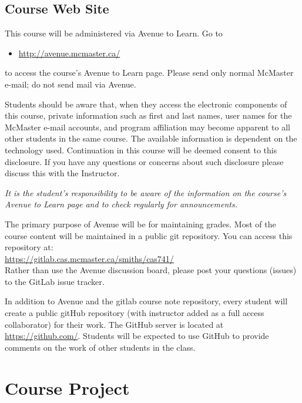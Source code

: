 \documentclass[12pt]{article}
\newcommand{\bi}{\begin{itemize}}
\newcommand{\ei}{\end{itemize}}
\begin{document}
\subsection*{Course Web Site}

This course will be administered via Avenue to Learn.  Go to

\bi

  \item[] \url{http://avenue.mcmaster.ca/} 

\ei

\noindent to access the course's Avenue to Learn page.  Please send only normal 
McMaster e-mail; do not send mail via Avenue.

Students should be aware that, when they access the electronic
components of this course, private information such as first and last
names, user names for the McMaster e-mail accounts, and program
affiliation may become apparent to all other students in the same
course.  The available information is dependent on the technology
used.  Continuation in this course will be deemed consent to this
disclosure.  If you have any questions or concerns about such
disclosure please discuss this with the Instructor.

\emph{It is the student's responsibility to be aware of the
  information on the course's Avenue to Learn page and to check
  regularly for announcements.}
  
The primary purpose of Avenue will be for maintaining grades.  Most
of the course content will be maintained in a public git repository.
You can access this repository at:\\

\href{https://gitlab.cas.mcmaster.ca/smiths/cas741/}{https://gitlab.cas.mcmaster.ca/smiths/cas741/}\\

\noindent Rather than use the Avenue discussion board, please post your
questions (issues) to the GitLab issue tracker.

In addition to Avenue and the gitlab course note repository, every student will
create a public gitHub repository (with instructor added as a full access
collaborator) for their work.  The GitHub server is located at
\url{https://github.com/}.  Students will be expected to use GitHub to provide
comments on the work of other students in the class.

\section {Course Project}
\end{document}
